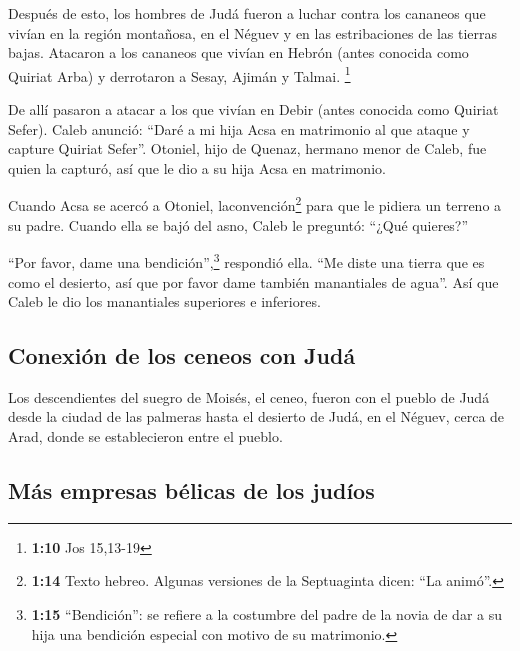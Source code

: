  Después de esto, los hombres de Judá fueron a luchar
contra los cananeos que vivían en la región montañosa, en el Néguev y en
las estribaciones de las tierras bajas.  Atacaron a los
cananeos que vivían en Hebrón (antes conocida como Quiriat Arba) y
derrotaron a Sesay, Ajimán y Talmai. \footnote{\textbf{1:10} Jos
  15,13-19}

 De allí pasaron a atacar a los que vivían en Debir
(antes conocida como Quiriat Sefer).  Caleb anunció:
``Daré a mi hija Acsa en matrimonio al que ataque y capture Quiriat
Sefer''.  Otoniel, hijo de Quenaz, hermano menor de
Caleb, fue quien la capturó, así que le dio a su hija Acsa en
matrimonio.

 Cuando Acsa se acercó a Otoniel, laconvención\footnote{\textbf{1:14}
  Texto hebreo. Algunas versiones de la Septuaginta dicen: ``La animó''.}
para que le pidiera un terreno a su padre. Cuando ella se bajó del asno,
Caleb le preguntó: ``¿Qué quieres?''

 ``Por favor, dame una bendición'',\footnote{\textbf{1:15}
  ``Bendición'': se refiere a la costumbre del padre de la novia de dar
  a su hija una bendición especial con motivo de su matrimonio.}
respondió ella. ``Me diste una tierra que es como el desierto, así que
por favor dame también manantiales de agua''. Así que Caleb le dio los
manantiales superiores e inferiores.

\hypertarget{conexiuxf3n-de-los-ceneos-con-juduxe1}{%
\subsection{Conexión de los ceneos con
Judá}\label{conexiuxf3n-de-los-ceneos-con-juduxe1}}

 Los descendientes del suegro de Moisés, el ceneo, fueron
con el pueblo de Judá desde la ciudad de las palmeras hasta el desierto
de Judá, en el Néguev, cerca de Arad, donde se establecieron entre el
pueblo.

\hypertarget{muxe1s-empresas-buxe9licas-de-los-juduxedos}{%
\subsection{Más empresas bélicas de los
judíos}\label{muxe1s-empresas-buxe9licas-de-los-juduxedos}}

